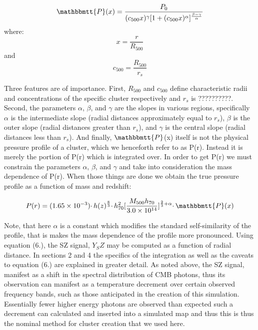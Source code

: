 \documentclass[12pt]{article} %
\begin{document}
\begin{equation}
\mathbbmtt{P}(x)=\frac{P_0}{(c_{500}x)^\gamma [1 + (c_{500}x)^\alpha]^\frac{\beta - \gamma}{\alpha}} 
\end{equation}
where:
\begin{equation}
x = \frac{r}{R_{500}}
\end{equation}
and
\begin{equation}
c_{500} = \frac{R_{500}}{r_s}
\end{equation}

Three features are of importance. First, $R_{500}$ and $c_{500}$ define characteristic radii and concentrations of the specific cluster respectively and $r_s$ is ??????????. Second, the parameters $\alpha$, $\beta$, and $\gamma$ are the slopes in various regions, specifically $\alpha$ is the intermediate slope (radial distances approximately equal to $r_s$), $\beta$ is the outer slope (radial distances greater than $r_s$), and $\gamma$ is the central slope (radial distances less than $r_s$).  And finally,  $\mathbbmtt{P}$(x) itself is not the physical pressure profile of a cluster, which we henceforth refer to as P(r). Instead it is merely the portion of P(r) which is integrated over. In order to get P(r) we must constrain the parameters $\alpha$, $\beta$, and $\gamma$ and take into consideration the mass dependence of P(r). When those things are done we obtain the true pressure profile as a function of mass and redshift: 

\begin{equation}
P(r) = (1.65 \times 10^{-3}) \cdotp h(z)^\frac{8}{3} \cdotp h^2_{70}[\frac{M_{500}h_{70}}{3.0 \times 10^{14}}]^{\frac{2}{3} + \alpha} \cdotp \mathbbmtt{P}(x)
\end{equation}

Note, that here $\alpha$ is a constant which modifies the standard self-similarity of the profile, that is makes the mass dependence of the profile more pronounced. Using equation (6.), the SZ signal, $Y_SZ$ may be computed as a function of radial distance. In sections 2 and 4 the specifics of the integration as well as the caveats to equation (6.) are explained in greater detail. As noted above, the SZ signal, manifest as a shift in the spectral distribution of CMB photons, thus its observation can manifest as a temperature decrement over certain observed frequency bands, such as those anticipated in the creation of this simulation. Essentially fewer higher energy photons are observed than expected such a decrement can calculated and inserted into a simulated map and thus this is thus the nominal method for cluster creation that we used here.
\end{document}
